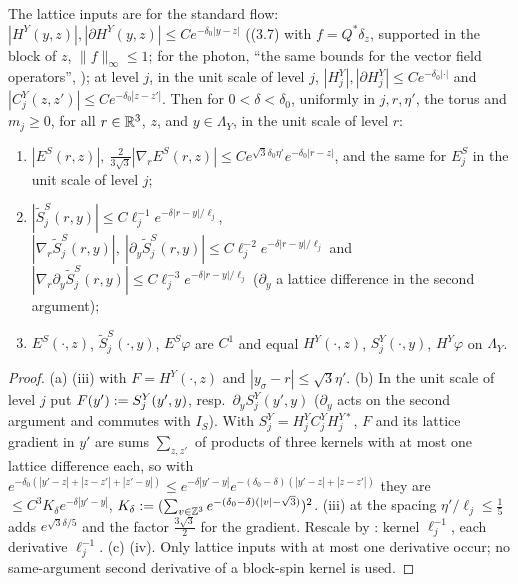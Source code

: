 \begin{lemma}\label{rot:hyb:lem:ESB}
The lattice inputs are \cite[(3.6), (3.7), (3.63)]{K1} for the standard flow: $|H^Y(y,z)|,|\partial H^Y(y,z)|\le Ce^{-\delta_0|y-z|}$ ((3.7) with $f=Q^*\delta_z$, supported in the block of $z$, $\|f\|_\infty\le1$; for the photon, ``the same bounds for the vector field operators'', \cite[p.~656]{K1}); at level $j$, in the unit scale of level $j$, $|H^Y_j|,|\partial H^Y_j|\le Ce^{-\delta_0|\cdot|}$ and $|C^Y_j(z,z')|\le Ce^{-\delta_0|z-z'|}$. Then for $0<\delta<\delta_0$, uniformly in $j,r,\eta'$, the torus and $m_j\ge0$, for all $r\in\mathbb R^3$, $z$, and $y\in\Lambda_Y$, in the unit scale of level $r$:
\begin{enumerate}[label=\textup{(\alph*)},leftmargin=*]
\item $|E^S(r,z)|,\ \frac{2}{3\sqrt3}|\nabla_rE^S(r,z)|\le Ce^{\sqrt3\delta_0\eta'}e^{-\delta_0|r-z|}$, and the same for $E^S_j$ in the unit scale of level $j$;
\item $|\tilde S^S_j(r,y)|\le C\ell_j^{-1}e^{-\delta|r-y|/\ell_j}$, $|\nabla_r\tilde S^S_j(r,y)|,\ |\partial_y\tilde S^S_j(r,y)|\le C\ell_j^{-2}e^{-\delta|r-y|/\ell_j}$ and $|\nabla_r\partial_y\tilde S^S_j(r,y)|\le C\ell_j^{-3}e^{-\delta|r-y|/\ell_j}$ ($\partial_y$ a lattice difference in the second argument);
\item $E^S(\cdot,z)$, $\tilde S^S_j(\cdot,y)$, $E^S\varphi$ are $C^1$ and equal $H^Y(\cdot,z)$, $S^Y_j(\cdot,y)$, $H^Y\varphi$ on $\Lambda_Y$.
\end{enumerate}
\end{lemma}
\begin{proof}
(a) (iii) with $F=H^Y(\cdot,z)$ and $|y_\sigma-r|\le\sqrt3\eta'$. (b) In the unit scale of level $j$ put $F(y'):= S^Y_j(y',y)$, resp.\ $\partial_yS^Y_j(y',y)$ ($\partial_y$ acts on the second argument and commutes with $I_S$). With $S^Y_j=H^Y_jC^Y_jH^{Y*}_j$, $F$ and its lattice gradient in $y'$ are sums $\sum_{z,z'}$ of products of three kernels with at most one lattice difference each, so with $e^{-\delta_0(|y'-z|+|z-z'|+|z'-y|)}\le e^{-\delta|y'-y|}e^{-(\delta_0-\delta)(|y'-z|+|z-z'|)}$ they are $\le C^3K_\delta e^{-\delta|y'-y|}$, $K_\delta:=(\sum_{v\in\mathbb Z^3}e^{-(\delta_0-\delta)(|v|-\sqrt3)})^2$. (iii) at the spacing $\eta'/\ell_j\le\frac15$ adds $e^{\sqrt3\delta/5}$ and the factor $\frac{3\sqrt3}2$ for the gradient. Rescale by \cite[(2.20)]{K1}: kernel $\ell_j^{-1}$, each derivative $\ell_j^{-1}$. (c) (iv). Only lattice inputs with at most one derivative occur; no same-argument second derivative of a block-spin kernel is used.
\end{proof}


